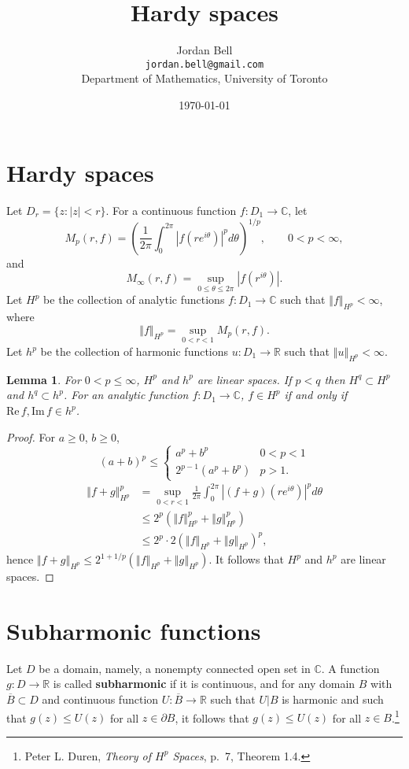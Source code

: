 \documentclass{article}
\def\Re{\ensuremath{\mathrm{Re}}\,}
\def\Im{\ensuremath{\mathrm{Im}}\,}
\newcommand{\norm}[1]{\left\Vert #1 \right\Vert}
\newtheorem{lemma}[theorem]{Lemma}
\theoremstyle{definition}
\begin{document}
\title{Hardy spaces}
\author{Jordan Bell\\ \texttt{jordan.bell@gmail.com}\\Department of Mathematics, University of Toronto}
\date{\today}

\maketitle

\section{Hardy spaces}
Let $D_r=\{z:|z|<r\}$. For a continuous function $f:D_1 \to \mathbb{C}$,
let
\[
M_p(r,f) = \left( \frac{1}{2\pi} \int_0^{2\pi} |f(re^{i\theta})|^p d\theta \right)^{1/p},
\qquad 0<p<\infty,
\]
and
\[
M_\infty(r,f) = \sup_{0 \leq \theta \leq 2\pi} |f(r^{i\theta})|.
\]
Let $H^p$ be the collection of analytic functions $f:D_1 \to \mathbb{C}$ 
such that $\norm{f}_{H^p}<\infty$, where
\[
\norm{f}_{H^p} = \sup_{0<r<1} M_p(r,f).
\]
Let $h^p$ be the collection of harmonic functions $u:D_1 \to \mathbb{R}$ such that $\norm{u}_{H^p} <\infty$.

\begin{lemma}
For $0<p \leq \infty$,
$H^p$ and $h^p$ are linear spaces.
If $p<q$ then $H^q \subset H^p$ and $h^q \subset h^p$. 
For an analytic function $f:D_1 \to \mathbb{C}$, $f \in H^p$ if and only if $\Re f, \Im f \in h^p$. 
\end{lemma}
\begin{proof}
For $a \geq 0$, $b \geq 0$,
\[
(a+b)^p \leq \begin{cases}
a^p+b^p&0<p<1\\
2^{p-1}(a^p+b^p)&p>1.
\end{cases}
\]
\begin{align*}
\norm{f+g}_{H^p}^p &= \sup_{0<r<1}  \frac{1}{2\pi} \int_0^{2\pi} |(f+g)(re^{i\theta})|^p d\theta\\
&\leq 2^p (\norm{f}_{H^p}^p+\norm{g}_{H^p}^p)\\
&\leq 2^p \cdot 2 (\norm{f}_{H^p}+\norm{g}_{H^p})^p,
\end{align*}
hence $\norm{f+g}_{H^p} \leq 2^{1+1/p} (\norm{f}_{H^p}+\norm{g}_{H^p})$. 
It follows that $H^p$ and $h^p$ are linear spaces.
\end{proof}


\section{Subharmonic functions}
Let $D$ be a domain,  namely, a nonempty connected open set in $\mathbb{C}$. 
A function $g:D \to \mathbb{R}$ is called \textbf{subharmonic} if it is continuous, 
and for any domain $B$ with $\overline{B} \subset D$ and continuous function
$U:\overline{B} \to \mathbb{R}$ such that $U|B$ is harmonic and such that
$g(z) \leq U(z)$ for all $z \in \partial B$, 
it follows that $g(z) \leq U(z)$ for all $z \in B$.\footnote{Peter L. Duren,
{\em Theory of $H^p$ Spaces}, p.~7, Theorem 1.4.}
\end{document}
